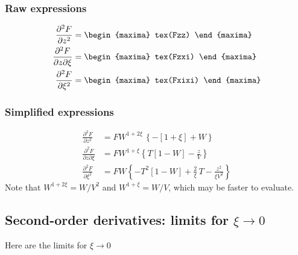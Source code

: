 \begin{landscape}
\subsubsection*{Raw expressions}
  \color{MonVertF}
\begin{align*}
  \frac{\partial^2 F}{\partial z^2}
  &=
    \begin{maxima}
       tex(Fzz)
     \end{maxima} \\
  \frac{\partial^2 F}{\partial z \partial \xi}
  &=
    \begin{maxima}
      tex(Fzxi)
    \end{maxima} \\
  \frac{\partial^2 F}{\partial \xi^2}
  &=
    \begin{maxima}
       tex(Fxixi)
    \end{maxima} \\
\end{align*}
\end{landscape}


\subsubsection*{Simplified expressions}

{\color{red}
\begin{align*}
  \frac{\partial^2 F}{\partial z^2}
  &= F W^{1+2\xi} \,\left\{-[1 + \xi]  + W \right\} \\
  \frac{\partial^2 F}{\partial z \partial \xi}
  &= F W^{1 + \xi}  \left\{ T \left[1 - W \right]
    - \frac{z}{V} \right\}\\
  \frac{\partial^2 F}{\partial \xi^2}
  &= F W \left\{ - T^2 \left[1 - W \right] + \frac{2}{\xi}\, T - \frac{z^2}{\xi V^2} \right\}
\end{align*}
}
Note that $W^{1+ 2\xi}= W/V^2$ and  $W^{1+ \xi}= W/V$, which may be faster to
evaluate.

\subsection{Second-order derivatives: limits for $\xi \to 0$}

Here are the limits for $\xi \to 0$

